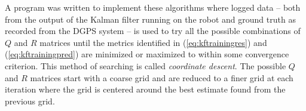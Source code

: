 A program was written to implement these algorithms where logged data -- both from the output of the Kalman filter running on the robot and ground truth as recorded from the DGPS system -- is used to try all the possible combinations of $Q$ and $R$ matrices until the metrics identified in (\ref{eq:kftrainingres}) and (\ref{eq:kftrainingpred}) are minimized or maximized to within some convergence criterion. This method of searching is called \textit{coordinate descent}. The possible $Q$ and $R$ matrices start with a coarse grid and are reduced to a finer grid at each iteration where the grid is centered around the best estimate found from the previous grid.

